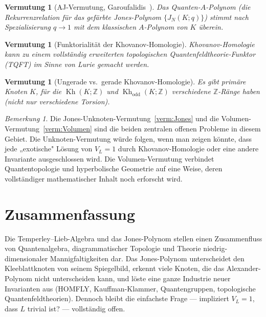 \documentclass[12pt,a4paper]{amsart}
\newtheorem{vermutung}[theorem]{Vermutung}
\theoremstyle{definition}
\theoremstyle{remark}
\newtheorem{bemerkung}[theorem]{Bemerkung}
\newcommand{\Z}{\mathbb{Z}}
\DeclareMathOperator{\Kh}{Kh}
\begin{document}
\begin{vermutung}[AJ-Vermutung, Garoufalidis~\cite{Garoufalidis2004}]
\label{verm:AJ}
Das Quanten-$A$-Polynom (die Rekurrenzrelation für das gefärbte Jones-Polynom
$\{J_N(K;q)\}$) stimmt nach Spezialisierung $q \to 1$ mit dem klassischen
$A$-Polynom von $K$ überein.
\end{vermutung}

\begin{vermutung}[Funktorialität der Khovanov-Homologie]
\label{verm:Kh-func}
Khovanov-Homologie kann zu einem vollständig erweiterten topologischen
Quantenfeldtheorie-Funktor (TQFT) im Sinne von Lurie gemacht werden.
\end{vermutung}

\begin{vermutung}[Ungerade vs.\ gerade Khovanov-Homologie]
Es gibt primäre Knoten $K$, für die $\Kh(K; \Z)$ und
$\Kh_{\mathrm{odd}}(K; \Z)$ verschiedene $\Z$-Ränge haben (nicht nur
verschiedene Torsion).
\end{vermutung}

\begin{bemerkung}
Die Jones-Unknoten-Vermutung~\ref{verm:Jones} und die Volumen-Vermutung~\ref{verm:Volumen}
sind die beiden zentralen offenen Probleme in diesem Gebiet. Die
Unknoten-Vermutung würde folgen, wenn man zeigen könnte, dass jede
„exotische" Lösung von $V_L = 1$ durch Khovanov-Homologie oder eine
andere Invariante ausgeschlossen wird. Die Volumen-Vermutung verbindet
Quantentopologie und hyperbolische Geometrie auf eine Weise, deren
vollständiger mathematischer Inhalt noch erforscht wird.
\end{bemerkung}

\section{Zusammenfassung}

Die Temperley--Lieb-Algebra und das Jones-Polynom stellen einen Zusammenfluss
von Quantenalgebra, diagrammatischer Topologie und Theorie niedrig-dimensionaler
Mannigfaltigkeiten dar. Das Jones-Polynom unterscheidet den Kleeblattknoten
von seinem Spiegelbild, erkennt viele Knoten, die das Alexander-Polynom nicht
unterscheiden kann, und löste eine ganze Industrie neuer Invarianten aus
(HOMFLY, Kauffman-Klammer, Quantengruppen, topologische Quantenfeldtheorien).
Dennoch bleibt die einfachste Frage — impliziert $V_L = 1$, dass $L$ trivial ist? —
vollständig offen.
\end{document}
